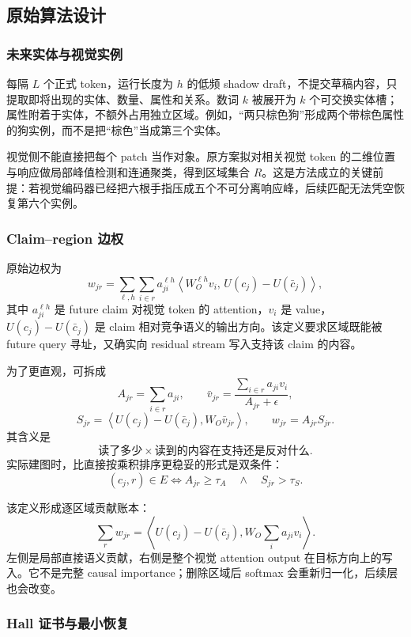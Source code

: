 \documentclass[UTF8,zihao=-4,a4paper]{ctexart}
\begin{document}
\subsection{原始算法设计}

\subsubsection{未来实体与视觉实例}

每隔 $L$ 个正式 token，运行长度为 $h$ 的低频 shadow draft，不提交草稿内容，只提取即将出现的实体、数量、属性和关系。数词 $k$ 被展开为 $k$ 个可交换实体槽；属性附着于实体，不额外占用独立区域。例如，“两只棕色狗”形成两个带棕色属性的狗实例，而不是把“棕色”当成第三个实体。

视觉侧不能直接把每个 patch 当作对象。原方案拟对相关视觉 token 的二维位置与响应做局部峰值检测和连通聚类，得到区域集合 $R$。这是方法成立的关键前提：若视觉编码器已经把六根手指压成五个不可分离响应峰，后续匹配无法凭空恢复第六个实例。

\subsubsection{Claim--region 边权}

原始边权为
\[
w_{jr}
=
\sum_{\ell,h}\sum_{i\in r}
a^{\ell h}_{ji}
\left\langle
W_O^{\ell h}v_i,\,
U(c_j)-U(\bar c_j)
\right\rangle,
\]
其中 $a_{ji}^{\ell h}$ 是 future claim 对视觉 token 的 attention，$v_i$ 是 value，$U(c_j)-U(\bar c_j)$ 是 claim 相对竞争语义的输出方向。该定义要求区域既能被 future query 寻址，又确实向 residual stream 写入支持该 claim 的内容。

为了更直观，可拆成
\[
A_{jr}=\sum_{i\in r}a_{ji},
\qquad
\bar v_{jr}=\frac{\sum_{i\in r}a_{ji}v_i}{A_{jr}+\epsilon},
\]
\[
S_{jr}=\left\langle U(c_j)-U(\bar c_j),W_O\bar v_{jr}\right\rangle,
\qquad
w_{jr}=A_{jr}S_{jr}.
\]
其含义是
\[
\text{读了多少}\times\text{读到的内容在支持还是反对什么}.
\]
实际建图时，比直接按乘积排序更稳妥的形式是双条件：
\[
(c_j,r)\in E
\iff
A_{jr}\ge\tau_A
\quad\land\quad
S_{jr}>\tau_S.
\]

该定义形成逐区域贡献账本：
\[
\sum_r w_{jr}
=
\left\langle
U(c_j)-U(\bar c_j),
W_O\sum_i a_{ji}v_i
\right\rangle.
\]
左侧是局部直接语义贡献，右侧是整个视觉 attention output 在目标方向上的写入。它不是完整 causal importance；删除区域后 softmax 会重新归一化，后续层也会改变。

\subsubsection{Hall 证书与最小恢复}
\end{document}
